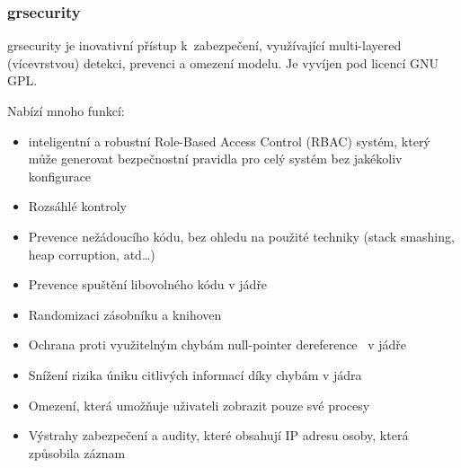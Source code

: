 \documentclass[a4paper,12pt]{article}
\begin{document}


\subsubsection{grsecurity}
grsecurity je inovativní přístup k~zabezpečení, využívající multi-layered (vícevrstvou) detekci, prevenci a omezení modelu. Je vyvíjen pod licencí GNU GPL.~\cite{Grsecurity}

Nabízí mnoho funkcí:
\begin{itemize}
 \item inteligentní a robustní Role-Based Access Control (RBAC) systém, který může generovat bezpečnostní pravidla pro celý systém bez jakékoliv konfigurace
 \item Rozsáhlé kontroly
 \item Prevence nežádoucího kódu, bez ohledu na použité techniky (stack smashing, heap corruption, atd…)
 \item Prevence spuštění libovolného kódu v jádře
 \item Randomizaci zásobníku a knihoven
 \item Ochrana proti využitelným chybám null-pointer dereference~\cite{Null-pointerDereference} v jádře
 \item Snížení rizika úniku citlivých informací díky chybám v jádra
 \item Omezení, která umožňuje uživateli zobrazit pouze své procesy
 \item Výstrahy zabezpečení a audity, které obsahují IP adresu osoby, která způsobila záznam
\end{itemize}
\end{document}

